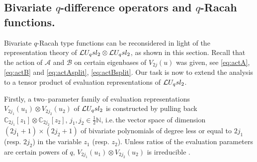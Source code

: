 \documentclass[11pt]{amsart}
\numberwithin{equation}{section}
\numberwithin{equation}{section}
\begin{document}
\subsection{Bivariate $q$-difference operators and $q$-Racah functions.} 

Bivariate $q$-Racah type functions can be reconsidered in light of the representation theory of $\mathcal{L} U_q sl_2 \otimes \mathcal{L} U_q sl_2$, as shown in this section. Recall that the action of $\mathcal{A}$ and $\mathcal{B}$ on certain eigenbases of $V_{2j}(u)$ was given, see \eqref{eq:actA}, \eqref{eq:actB} and \eqref{eq:actAsplit}, \eqref{eq:actBsplit}. Our task is now to extend the analysis to a tensor product of evaluation representations of $\mathcal{L} U_q sl_2$.

Firstly, a two--parameter family of evaluation representations 
$V_{2j_1}(u_1)\otimes V_{2j_2}(u_2)$ of $\mathcal{L} U_q sl_2$ is constructed by pulling back $\mathbb{C}_{2j_1}[z_1]\otimes \mathbb{C}_{2j_2}[z_2]$, $j_1,j_2\in\frac{1}{2}{\mathbb N}$, i.e.\,the vector space of dimension $(2j_1 +1)\times(2j_2+1)$ of bivariate polynomials of degree less or equal to $2j_1$ (resp. $2j_2$) in the variable $z_1$ (resp. $z_2$).
Unless ratios of the evaluation parameters are certain powers of $q$, $V_{2j_1}(u_1)\otimes V_{2j_2}(u_2)$  is irreducible \cite{CP91}.
\end{document}
